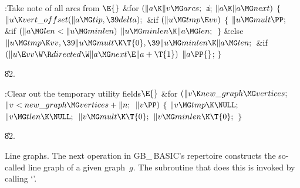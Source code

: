 \B{}:Take note of all arcs from \X${}\E{}$\6
\&{for} ${}(\|a\K\|v\MG\\{arcs};{}$ \|a; ${}\|a\K\|a\MG\\{next}){}$\5
${}\{{}$\1\6
${}\|u\K\\{vert\_offset}(\|a\MG\\{tip},\39\\{delta});{}$\6
\&{if} ${}(\|u\MG\\{tmp}\E\\{vv}){}$\5
${}\{{}$\1\6
${}\|u\MG\\{mult}\PP;{}$\6
\&{if} ${}(\|a\MG\\{len}<\|u\MG\\{minlen}){}$\1\5
${}\|u\MG\\{minlen}\K\|a\MG\\{len};{}$\2\6
\4${}\}{}$\5
\2\&{else}\1\5
${}\|u\MG\\{tmp}\K\\{vv},\39\|u\MG\\{mult}\K\T{0},\39\|u\MG\\{minlen}\K\|a\MG%
\\{len};{}$\2\6
\&{if} ${}(\|u\E\\{vv}\W\R\\{directed}\W\|a\MG\\{next}\E\|a+\T{1}){}$\1\5
${}\|a\PP{}$;\2\6
\4${}\}{}$\2\par
\U82.\fi

\B{}:Clear out the temporary utility fields\X${}\E{}$\6
\&{for} ${}(\|v\K\\{new\_graph}\MG\\{vertices};{}$ ${}\|v<\\{new\_graph}\MG%
\\{vertices}+\|n;{}$ ${}\|v\PP){}$\5
${}\{{}$\1\6
${}\|v\MG\\{tmp}\K\NULL;{}$\6
${}\|v\MG\\{tlen}\K\NULL;{}$\6
${}\|v\MG\\{mult}\K\T{0};{}$\6
${}\|v\MG\\{minlen}\K\T{0};{}$\6
\4${}\}{}$\2\par
\U82.\fi

Line graphs. The next operation in {\sc GB\_\,BASIC}'s repertoire
constructs
the so-called line graph of a given graph~$g$. The subroutine that does
this is invoked by calling `'.

